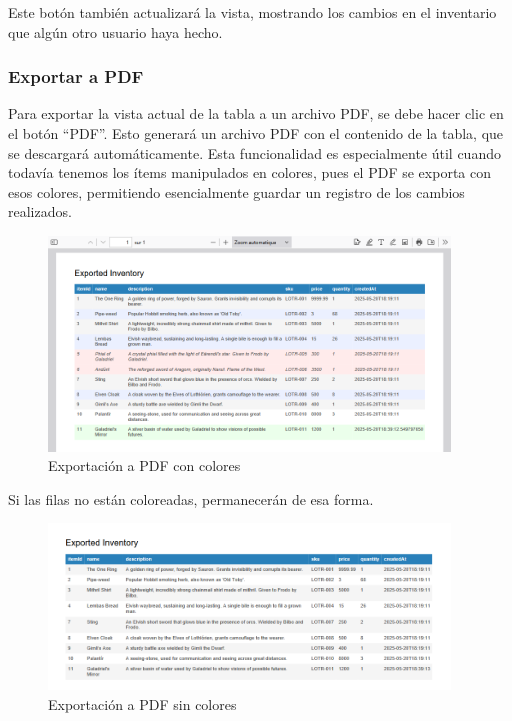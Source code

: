 Este botón también actualizará la vista, mostrando los cambios en el inventario que algún otro usuario haya hecho.

\subsubsection{Exportar a PDF}

Para exportar la vista actual de la tabla a un archivo PDF, se debe hacer clic en el botón “PDF”. Esto generará un archivo PDF con el contenido de la tabla, que se descargará automáticamente. Esta funcionalidad es especialmente útil cuando todavía tenemos los ítems manipulados en colores, pues el PDF se exporta con esos colores, permitiendo esencialmente guardar un registro de los cambios realizados.

\begin{figure}[H]
    \centering
    \includegraphics[width=0.95\textwidth]{images/20 PDF Colores}
    \caption{Exportación a PDF con colores}
\end{figure}

Si las filas no están coloreadas, permanecerán de esa forma.

\begin{figure}[H]
    \centering
    \includegraphics[width=0.95\textwidth]{images/21 PDF Actualizado}
    \caption{Exportación a PDF sin colores}
\end{figure}

